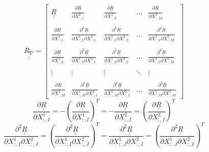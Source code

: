 \begin{displaymath}
\underline{\underline{R_{\nabla}}}=\begin{bmatrix}
\underline{\underline{R}} & \frac{\partial \underline{\underline{R}}}{\partial X_{:,1}^2} & \frac{\partial \underline{\underline{R}}}{\partial X_{:,2}^2} & \dotsc & \frac{\partial \underline{\underline{R}}}{\partial X_{:,M}^2} \\ \\
\frac{\partial \underline{\underline{R}}}{\partial X_{:,1}^1} & \frac{\partial^2 \underline{\underline{R}}}{\partial X_{:,1}^1 \partial X_{:,1}^2} & \frac{\partial^2 \underline{\underline{R}}}{\partial X_{:,1}^1 \partial X_{:,2}^2} & \dotsc & \frac{\partial^2 \underline{\underline{R}}}{\partial X_{:,1}^1 \partial X_{:,M}^2} \\ \\
\frac{\partial \underline{\underline{R}}}{\partial X_{:,2}^1} & \frac{\partial^2 \underline{\underline{R}}}{\partial X_{:,2}^1 \partial X_{:,1}^2} & \frac{\partial^2 \underline{\underline{R}}}{\partial X_{:,2}^1 \partial X_{:,2}^2} & \dotsc & \frac{\partial^2 \underline{\underline{R}}}{\partial X_{:,2}^1 \partial X_{:,M}^2} \\ \\
\vdots & \vdots & \vdots & \ddots & \vdots \\ \\
\frac{\partial \underline{\underline{R}}}{\partial X_{:,M}^1} & \frac{\partial^2 \underline{\underline{R}}}{\partial X_{:,M}^1 \partial X_{:,1}^2} & \frac{\partial^2 \underline{\underline{R}}}{\partial X_{:,M}^1 \partial X_{:,2}^2} & \dotsc & \frac{\partial^2 \underline{\underline{R}}}{\partial X_{:,M}^1 \partial X_{:,M}^2} 
\end{bmatrix}
\end{displaymath}
\begin{displaymath}
\frac{\partial \underline{\underline{R}}}{\partial X_{:,I}^1}=-\left(\frac{\partial \underline{\underline{R}}}{\partial X_{:,I}^1}\right)^T=-\frac{\partial \underline{\underline{R}}}{\partial X_{:,I}^2}=\left(\frac{\partial \underline{\underline{R}}}{\partial X_{:,I}^2}\right)^T
\end{displaymath}
\begin{displaymath}
\frac{\partial^2 \underline{\underline{R}}}{\partial X_{:,I}^1 \partial X_{:,J}^2}=\left(\frac{\partial^2 \underline{\underline{R}}}{\partial X_{:,I}^1 \partial X_{:,J}^2}\right)^T=\frac{\partial^2 \underline{\underline{R}}}{\partial X_{:,J}^1 \partial X_{:,I}^2}=\left(\frac{\partial^2 \underline{\underline{R}}}{\partial X_{:,J}^1 \partial X_{:,I}^2}\right)^T
\end{displaymath}

